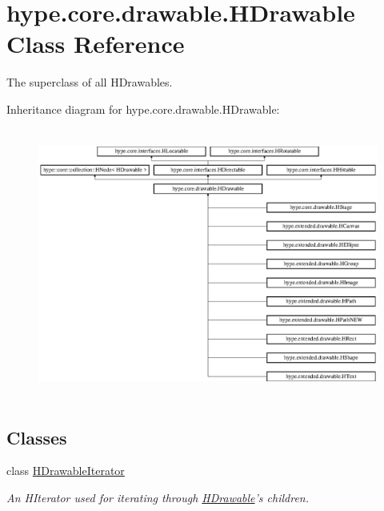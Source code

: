 \hypertarget{classhype_1_1core_1_1drawable_1_1_h_drawable}{\section{hype.\-core.\-drawable.\-H\-Drawable Class Reference}
\label{classhype_1_1core_1_1drawable_1_1_h_drawable}
}


The superclass of all H\-Drawables.  


Inheritance diagram for hype.\-core.\-drawable.\-H\-Drawable\-:\begin{figure}[H]
\begin{center}
\leavevmode
\includegraphics[height=8.921569cm]{classhype_1_1core_1_1drawable_1_1_h_drawable}
\end{center}
\end{figure}
\subsection*{Classes}
\begin{DoxyCompactItemize}
\item 
class \hyperlink{classhype_1_1core_1_1drawable_1_1_h_drawable_1_1_h_drawable_iterator}{H\-Drawable\-Iterator}
\begin{DoxyCompactList}\small\item\em An H\-Iterator used for iterating through \hyperlink{classhype_1_1core_1_1drawable_1_1_h_drawable}{H\-Drawable}'s children. \end{DoxyCompactList}\end{DoxyCompactItemize}

